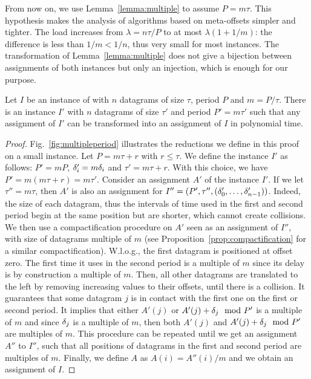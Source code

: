 From now on, we use Lemma~\ref{lemma:multiple} to assume $P = m\tau$. This hypothesis makes the analysis of algorithms based on meta-offsets simpler and tighter. The load increases from $\lambda = n \tau / P$ to at most $\lambda (1 + 1/m)$: the difference is less than $1/m < 1/n$, thus very small for most instances. The transformation of Lemma~\ref{lemma:multiple} does not give a bijection between assignments of both instances but only an injection, which is enough for our purpose. 

\begin{lemma}\label{lemma:multiple}
Let $I$ be an instance of \pma with $n$ datagrams of size $\tau$, period $P$ and $m = P / \tau$. There is an instance $I'$ with $n$ datagrams of size $\tau'$ and period $P'= m\tau'$ such that any assignment of $I'$ can be transformed into an assignment of $I$ in polynomial time.
\end{lemma}
\begin{proof}
Fig.~\ref{fig:multipleperiod} illustrates the reductions we define in this proof on a small instance.
Let $P = m \tau + r$ with $r \leq \tau$. We define the instance $I'$ as follows: $P' = mP$, $\delta_{i}' = m \delta_i$ and $\tau' = m \tau + r$. With this choice, we have $P' = m(m \tau + r) = m \tau'$.
Consider an assignment $A'$ of the instance $I'$.
If we let $\tau'' = m\tau$, then $A'$ is also an assignment for $I'' = (P',\tau'',(\delta_{0}',\dots,\delta_{n-1}'))$. Indeed, the size of each datagram, thus the intervals of time used in the first and second period begin at the same position but are shorter, which cannot create collisions. We then use a compactification procedure on $A'$ seen as an assignment of $I''$,
with size of datagrams multiple of $m$ (see Proposition~\ref{prop:compactification} for a similar compactification). W.l.o.g., the first datagram is positioned at offset zero. The first time it uses in the second period is a multiple of $m$ since its delay is by construction a multiple of $m$. Then, all other datagrams are translated to the left by removing increasing values to their offsets, until there is a collision. It guarantees that some datagram $j$ is in contact with the first one on the first or second period. It implies that either $A'(j)$ or $A'(j)+\delta_j \mod P'$ is a multiple of $m$ and since $\delta_j$ is a multiple of $m$, then both $A'(j)$ and $A'(j)+\delta_j \mod P'$ are multiples of $m$. This procedure can be repeated until we get an assignment $A''$ to $I''$, such that all positions of datagrams in the first and second period are multiples of $m$. Finally, we define $A$ as $A(i) = A''(i)/m$ and we obtain an assignment of $I$. 
\end{proof}

